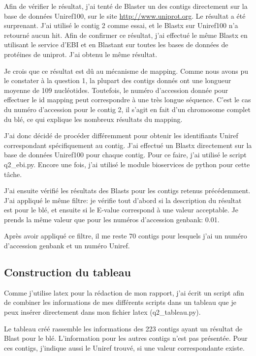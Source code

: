 \documentclass[10.9pt]{article} %
\begin{document}
Afin de vérifier le résultat, j'ai tenté de Blaster un des contigs directement sur la base de données Uniref100,
sur le site \url{http://www.uniprot.org}. Le résultat a été surprenant. J'ai utilisé le contig 2 comme essai,
et le Blastx sur Uniref100 n'a retourné aucun hit. Afin de confirmer ce résultat, j'ai effectué le même Blastx
en utilisant le service d'EBI et en Blastant sur toutes les bases de données de protéines de uniprot. J'ai obtenu
le même résultat.

Je crois que ce résultat est dû au mécanisme de mapping. Comme nous avons pu le constater à la question 1,
la plupart des contigs donnés ont une longueur moyenne de 109 nucléotides. Toutefois, le numéro d'accession
donnée pour effectuer le id mapping peut correspondre à une très longue séquence. C'est le cas du numéro
d'accession pour le contig 2, il s'agit en fait d'un chromosome complet du blé, ce qui explique les nombreux
résultats du mapping.

J'ai donc décidé de procéder différemment pour obtenir les identifiants Uniref correspondant spécifiquement au contig.
J'ai effectué un Blastx directement sur la base de données Uniref100 pour chaque contig. Pour ce faire, j'ai utilisé
le script q2\_ebi.py. Encore une fois, j'ai utilisé le module bioservices de python pour cette tâche.

J'ai ensuite vérifié les résultats des Blasts pour les contigs retenus précédemment. J'ai appliqué le même
filtre: je vérifie tout d'abord si la description du résultat est pour le blé, et ensuite si le E-value 
correspond à une valeur acceptable. Je prends la même valeur que pour les numéros d'accession genbank: 0.01.

Après avoir appliqué ce filtre, il me reste 70 contigs pour lesquels j'ai un numéro d'accession genbank et
un numéro Uniref.

\subsection{Construction du tableau}

Comme j'utilise latex pour la rédaction de mon rapport, j'ai écrit un script afin de combiner les informations
de mes différents scripts dans un tableau que je peux insérer directement dans mon fichier latex (q2\_tableau.py).

Le tableau créé rassemble les informations des 223 contigs ayant un résultat de Blast pour le blé. L'information
pour les autres contigs n'est pas présentée. Pour ces contigs, j'indique aussi le Uniref trouvé, si une valeur
correspondante existe.
\end{document}
